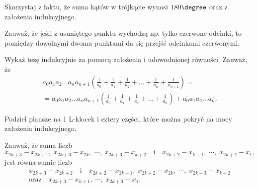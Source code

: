\newpage
{}


\begin{hints_list}
	\item Skorzystaj z faktu, że suma kątów w trójkącie wynosi $180\degree$ oraz z założenia indukcyjnego.

	\item *

	\item *

	\item Zauważ, że jeśli z usuniętego punktu wychodzą np. tylko czerwone odcinki, to pomiędzy dowolnymi dwoma punktami da się przejść odcinkami czerwonymi.

	\item Wykaż tezę indukcyjnie za pomocą założenia i udowodnionej równości. Zauważ, że 
	\begin{align*}
		a_0a_1a_2...a_na_{n+1}\left(\frac{1}{a_0} + \frac{1}{a_1} + \frac{1}{a_2} + ... + \frac{1}{a_n} + \frac{1}{a_{n + 1}}\right) = \\ =   a_0a_1a_2...a_na_{n+1}\left(\frac{1}{a_0} + \frac{1}{a_1} + \frac{1}{a_2} + ... + \frac{1}{a_n}\right) + a_0a_1a_2...a_n.
	\end{align*}

	\item Podziel plansze na 1 L-klocek i cztery części, które można pokryć na mocy założenia indukcyjnego.

	\item Zauważ, że suma liczb
	\[
		{x_{2k+3}-x_{2k+1}, \; x_{2k+3}-x_{2k},\; \cdots, \; x_{2k+3}-x_{k+2}} \quad \text{i} \quad {x_{2k+2}-x_{k+1},\; \cdots, \; x_{2k+2}-x_1},
	\]
	jest równa sumie liczb
\begin{gather*}
	x_{2k+3} - x_{2k+2} \quad \text{i} \quad x_{2k+2} - x_{2k+1},\; x_{2k+2} - x_{2k},\; \cdots,\; x_{2k+3} - x_{k+2}  \\ \text{oraz} \quad {x_{2k+3} - x_{k+1},\; \cdots, \; x_{2k+3}-x_1}.
\end{gather*}
\end{hints_list}